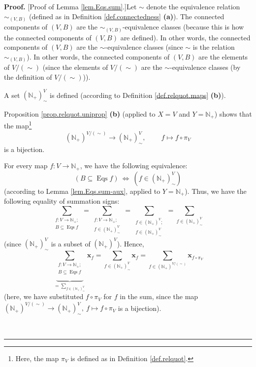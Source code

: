 \documentclass[numbers=enddot,12pt,final,onecolumn,notitlepage]{scrartcl}%
\theoremstyle{definition}
\newenvironment{proof}[1][Proof]{\noindent\textbf{#1.} }{\ \rule{0.5em}{0.5em}}
\newenvironment{verlong}{}{}
\let\sumnonlimits\sum
\renewcommand{\sum}{\sumnonlimits\limits}
\begin{document}
\begin{verlong}
\begin{proof}
[Proof of Lemma \ref{lem.Eqs.sum}.]Let $\sim$ denote the equivalence relation
$\sim_{\left(  V,B\right)  }$ (defined as in Definition
\ref{def.connectedness} \textbf{(a)}). The connected components of $\left(
V,B\right)  $ are the $\sim_{\left(  V,B\right)  }$-equivalence classes
(because this is how the connected components of $\left(  V,B\right)  $ are
defined). In other words, the connected components of $\left(  V,B\right)  $
are the $\sim$-equivalence classes (since $\sim$ is the relation
$\sim_{\left(  V,B\right)  }$). In other words, the connected components of
$\left(  V,B\right)  $ are the elements of $V/\left(  \sim\right)  $ (since
the elements of $V/\left(  \sim\right)  $ are the $\sim$-equivalence classes
(by the definition of $V/\left(  \sim\right)  $)).

A set $\left(  \mathbb{N}_{+}\right)  _{\sim}^{V}$ is defined (according to
Definition \ref{def.relquot.maps} \textbf{(b)}).

Proposition \ref{prop.relquot.uniprop} \textbf{(b)} (applied to $X=V$ and
$Y=\mathbb{N}_{+}$) shows that the map\footnote{Here, the map $\pi_{V}$ is
defined as in Definition \ref{def.relquot}.}%
\[
\left(  \mathbb{N}_{+}\right)  ^{V/\left(  \sim\right)  }\rightarrow\left(
\mathbb{N}_{+}\right)  _{\sim}^{V},\ \ \ \ \ \ \ \ \ \ f\mapsto f\circ\pi_{V}%
\]
is a bijection.

For every map $f:V\rightarrow\mathbb{N}_{+}$, we have the following
equivalence:%
\begin{equation}
\left(  B\subseteq\operatorname*{Eqs}f\right)  \ \Longleftrightarrow\ \left(
f\in\left(  \mathbb{N}_{+}\right)  _{\sim}^{V}\right)
\label{pf.lem.Eqs.sum.equivalence}%
\end{equation}
(according to Lemma \ref{lem.Eqs.sum-aux}, applied to $Y=\mathbb{N}_{+}$).
Thus, we have the following equality of summation signs:
\[
\sum_{\substack{f:V\rightarrow\mathbb{N}_{+};\\B\subseteq\operatorname*{Eqs}%
f}}=\sum_{\substack{f:V\rightarrow\mathbb{N}_{+};\\f\in\left(  \mathbb{N}%
_{+}\right)  _{\sim}^{V}}}=\sum_{\substack{f\in\left(  \mathbb{N}_{+}\right)
^{V};\\f\in\left(  \mathbb{N}_{+}\right)  _{\sim}^{V}}}=\sum_{f\in\left(
\mathbb{N}_{+}\right)  _{\sim}^{V}}%
\]
(since $\left(  \mathbb{N}_{+}\right)  _{\sim}^{V}$ is a subset of $\left(
\mathbb{N}_{+}\right)  ^{V}$). Hence,%
\begin{equation}
\underbrace{\sum_{\substack{f:V\rightarrow\mathbb{N}_{+};\\B\subseteq
\operatorname*{Eqs}f}}}_{=\sum_{f\in\left(  \mathbb{N}_{+}\right)  _{\sim}%
^{V}}}\mathbf{x}_{f}=\sum_{f\in\left(  \mathbb{N}_{+}\right)  _{\sim}^{V}%
}\mathbf{x}_{f}=\sum_{f\in\left(  \mathbb{N}_{+}\right)  ^{V/\left(
\sim\right)  }}\mathbf{x}_{f\circ\pi_{V}} \label{pf.lem.Eqs.sum.1}%
\end{equation}
(here, we have substituted $f\circ\pi_{V}$ for $f$ in the sum, since the map
$\left(  \mathbb{N}_{+}\right)  ^{V/\left(  \sim\right)  }\rightarrow\left(
\mathbb{N}_{+}\right)  _{\sim}^{V},\ f\mapsto f\circ\pi_{V}$ is a bijection).


\end{proof}
\end{verlong}
\end{document}
